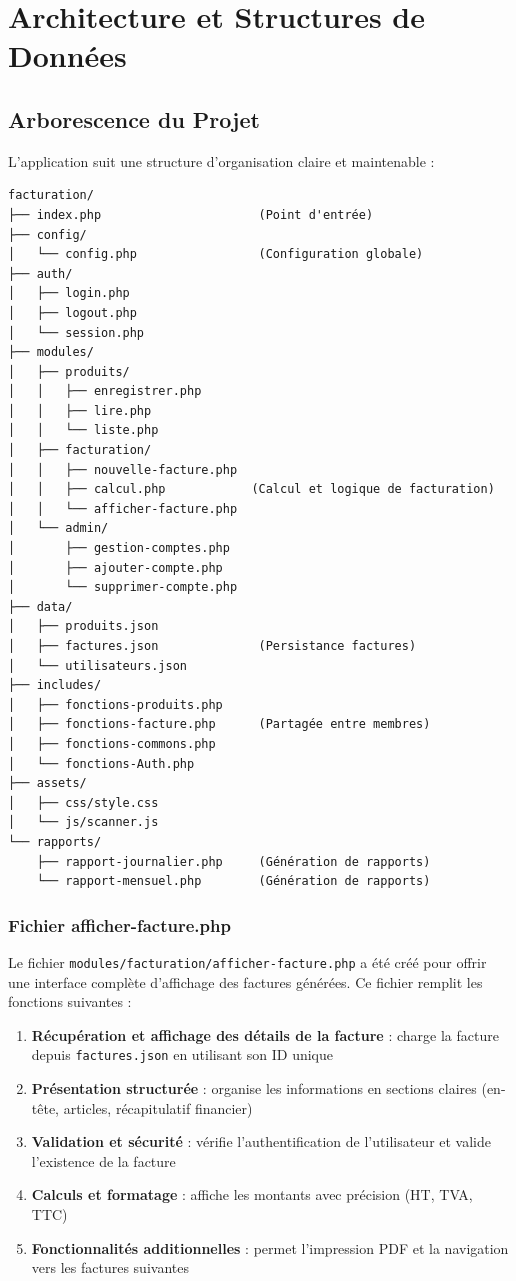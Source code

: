 \documentclass[12pt,a4paper]{report}
\begin{document}
\pagebreak

\chapter{Architecture et Structures de Données}

\section{Arborescence du Projet}

L'application suit une structure d'organisation claire et maintenable :

\begin{verbatim}
facturation/
├── index.php                      (Point d'entrée)
├── config/
│   └── config.php                 (Configuration globale)
├── auth/
│   ├── login.php
│   ├── logout.php
│   └── session.php
├── modules/
│   ├── produits/
│   │   ├── enregistrer.php
│   │   ├── lire.php
│   │   └── liste.php
│   ├── facturation/
│   │   ├── nouvelle-facture.php
│   │   ├── calcul.php            (Calcul et logique de facturation)
│   │   └── afficher-facture.php
│   └── admin/
│       ├── gestion-comptes.php
│       ├── ajouter-compte.php
│       └── supprimer-compte.php
├── data/
│   ├── produits.json
│   ├── factures.json              (Persistance factures)
│   └── utilisateurs.json
├── includes/
│   ├── fonctions-produits.php
│   ├── fonctions-facture.php      (Partagée entre membres)
│   ├── fonctions-commons.php
│   └── fonctions-Auth.php
├── assets/
│   ├── css/style.css
│   └── js/scanner.js
└── rapports/
    ├── rapport-journalier.php     (Génération de rapports)
    └── rapport-mensuel.php        (Génération de rapports)
\end{verbatim}

\subsection{Fichier afficher-facture.php}

Le fichier \texttt{modules/facturation/afficher-facture.php} a été créé pour offrir une interface complète d'affichage des factures générées. Ce fichier remplit les fonctions suivantes :

\begin{enumerate}
    \item \textbf{Récupération et affichage des détails de la facture} : charge la facture depuis \texttt{factures.json} en utilisant son ID unique
    \item \textbf{Présentation structurée} : organise les informations en sections claires (en-tête, articles, récapitulatif financier)
    \item \textbf{Validation et sécurité} : vérifie l'authentification de l'utilisateur et valide l'existence de la facture
    \item \textbf{Calculs et formatage} : affiche les montants avec précision (HT, TVA, TTC)
    \item \textbf{Fonctionnalités additionnelles} : permet l'impression PDF et la navigation vers les factures suivantes
\end{enumerate}
\end{document}
